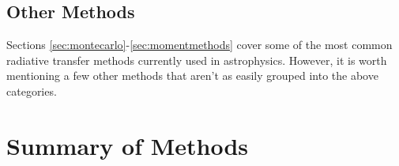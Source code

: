 \subsection{Other Methods}
\label{sec:othermethods}

Sections \ref{sec:montecarlo}-\ref{sec:momentmethods} cover some of the most common radiative transfer methods currently used in astrophysics. However, it is worth mentioning a few other methods that aren't as easily grouped into the above categories.




%
%

\section{Summary of Methods}
\label{sec:summaryofmethods}


%
%

